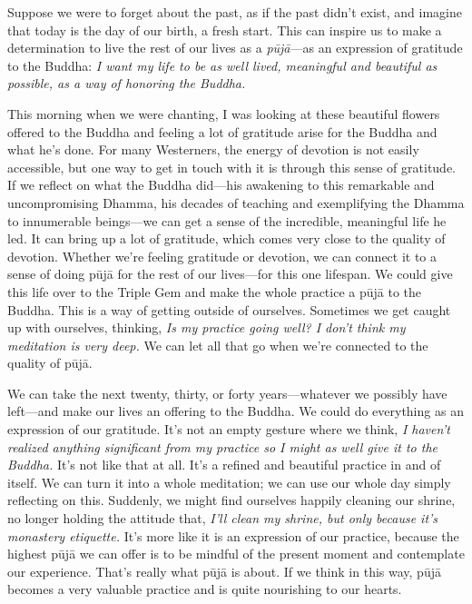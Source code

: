 Suppose we were to forget about the past, as if the past didn't exist, 
and imagine that today is the day of our birth, a fresh start. This can 
inspire us to make a determination to live the rest of our lives as a 
\emph{pūjā}---as an expression of gratitude to the Buddha: \emph{I 
want my life to be as well lived, meaningful and beautiful as possible, 
as a way of honoring the Buddha.}

This morning when we were chanting, I was looking at these beautiful 
flowers offered to the Buddha and feeling a lot of gratitude arise for 
the Buddha and what he's done. For many Westerners, the energy of 
devotion is not easily accessible, but one way to get in touch with it 
is through this sense of gratitude. If we reflect on what the Buddha 
did---his awakening to this remarkable and uncompromising Dhamma, his 
decades of teaching and exemplifying the Dhamma to innumerable 
beings---we can get a sense of the incredible, meaningful life he led. 
It can bring up a lot of gratitude, which comes very close to the 
quality of devotion. Whether we're feeling gratitude or devotion, we 
can connect it to a sense of doing pūjā for the rest of our 
lives---for this one lifespan. We could give this life over to the 
Triple Gem and make the whole practice a pūjā to the Buddha. This is 
a way of getting outside of ourselves. Sometimes we get caught up with 
ourselves, thinking, \emph{Is my practice going well? I don't think my 
meditation is very deep.} We can let all that go when we're connected 
to the quality of pūjā.

We can take the next twenty, thirty, or forty years---whatever we 
possibly have left---and make our lives an offering to the Buddha. We 
could do everything as an expression of our gratitude. It's not an 
empty gesture where we think, \emph{I haven't realized anything 
significant from my practice so I might as well give it to the Buddha.} 
It's not like that at all. It's a refined and beautiful practice in and 
of itself. We can turn it into a whole meditation; we can use our whole 
day simply reflecting on this. Suddenly, we might find ourselves 
happily cleaning our shrine, no longer holding the attitude that, 
\emph{I'll clean my shrine, but only because it's monastery etiquette.} 
It's more like it is an expression of our practice, because the highest 
pūjā we can offer is to be mindful of the present moment and 
contemplate our experience. That's really what pūjā is about. If we 
think in this way, pūjā becomes a very valuable practice and is quite 
nourishing to our hearts.


